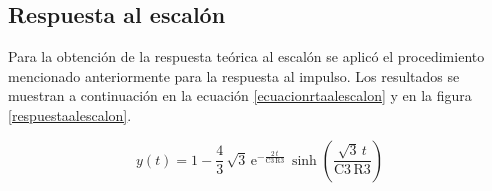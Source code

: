 \subsection{Respuesta al escalón}










Para la obtención de la respuesta teórica al escalón se aplicó el procedimiento mencionado anteriormente para la respuesta al impulso. Los resultados se muestran a continuación en la ecuación \ref{ecuacionrtaalescalon} y en la figura \ref{respuestaalescalon}.

\begin{equation}
y \! \left(t\right) = 1 - \dfrac{4}{3}\, \sqrt{3}\, \mathrm{e}^{-\frac{2\, t}{\mathrm{C3}\, \mathrm{R3}}}\, \sinh\!\left(\dfrac{\sqrt{3}\, t}{\mathrm{C3}\, \mathrm{R3}}\right)
\label{ecuacionrtaalescalon}
\end{equation}

